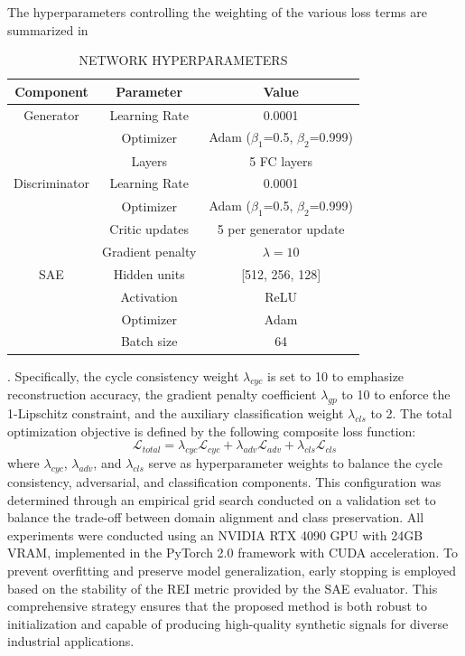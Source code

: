\documentclass[twocolumn]{IEEEtran}
\begin{document}
The hyperparameters controlling the weighting of the various loss terms are summarized in \begin{table}[htbp]
\centering
\caption{NETWORK HYPERPARAMETERS}
\label{tab:hyperparams}
\begin{tabular}{ccc}
\hline
Component & Parameter & Value \\
\hline
Generator & Learning Rate & 0.0001 \\
 & Optimizer & Adam ($\beta_1$=0.5, $\beta_2$=0.999) \\
 & Layers & 5 FC layers \\
Discriminator & Learning Rate & 0.0001 \\
 & Optimizer & Adam ($\beta_1$=0.5, $\beta_2$=0.999) \\
 & Critic updates & 5 per generator update \\
 & Gradient penalty & $\lambda=10$ \\
SAE & Hidden units & [512, 256, 128] \\
 & Activation & ReLU \\
 & Optimizer & Adam \\
 & Batch size & 64 \\
\hline
\end{tabular}
\end{table}. Specifically, the cycle consistency weight $\lambda_{cyc}$ is set to 10 to emphasize reconstruction accuracy, the gradient penalty coefficient $\lambda_{gp}$ to 10 to enforce the 1-Lipschitz constraint, and the auxiliary classification weight $\lambda_{cls}$ to 2. The total optimization objective is defined by the following composite loss function:
\begin{equation}
\mathcal{L}_{total} = \lambda_{cyc}\mathcal{L}_{cyc} + \lambda_{adv}\mathcal{L}_{adv} + \lambda_{cls}\mathcal{L}_{cls}
\label{eq:total_loss}
\end{equation}
where $\lambda_{cyc}$, $\lambda_{adv}$, and $\lambda_{cls}$ serve as hyperparameter weights to balance the cycle consistency, adversarial, and classification components. This configuration was determined through an empirical grid search conducted on a validation set to balance the trade-off between domain alignment and class preservation. All experiments were conducted using an NVIDIA RTX 4090 GPU with 24GB VRAM, implemented in the PyTorch 2.0 framework with CUDA acceleration. To prevent overfitting and preserve model generalization, early stopping is employed based on the stability of the REI metric provided by the SAE evaluator. This comprehensive strategy ensures that the proposed method is both robust to initialization and capable of producing high-quality synthetic signals for diverse industrial applications.
\end{document}
